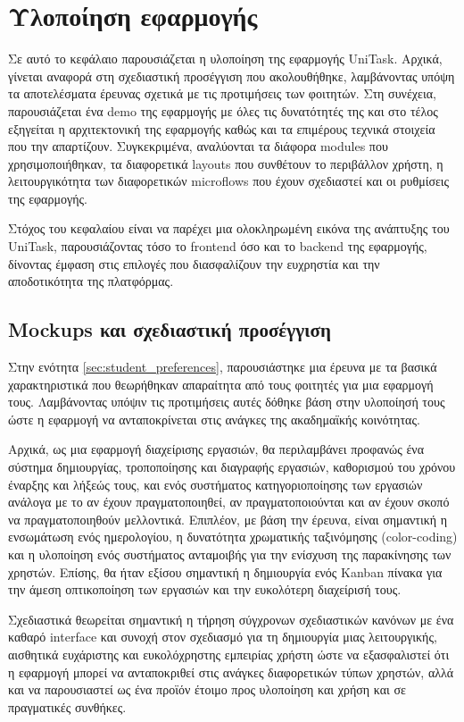 \chapter{Υλοποίηση εφαρμογής} \label{ch:unitask}
    Σε αυτό το κεφάλαιο παρουσιάζεται η υλοποίηση της εφαρμογής UniTask.  Αρχικά, γίνεται αναφορά στη σχεδιαστική προσέγγιση που ακολουθήθηκε, λαμβάνοντας υπόψη τα αποτελέσματα έρευνας σχετικά με τις προτιμήσεις των φοιτητών. Στη συνέχεια, παρουσιάζεται ένα demo της εφαρμογής με όλες τις δυνατότητές της και στο τέλος εξηγείται η αρχιτεκτονική της εφαρμογής καθώς και τα επιμέρους τεχνικά
    στοιχεία που την απαρτίζουν. Συγκεκριμένα, αναλύονται τα διάφορα modules που χρησιμοποιήθηκαν, τα διαφορετικά layouts που συνθέτουν το περιβάλλον χρήστη, η λειτουργικότητα των διαφορετικών microflows που έχουν σχεδιαστεί και οι ρυθμίσεις της εφαρμογής.

    Στόχος του κεφαλαίου είναι να παρέχει μια ολοκληρωμένη εικόνα της ανάπτυξης του UniTask, παρουσιάζοντας τόσο το frontend όσο και το backend της εφαρμογής, δίνοντας έμφαση στις επιλογές που διασφαλίζουν την ευχρηστία και την αποδοτικότητα της πλατφόρμας.

    \section{Mockups και σχεδιαστική προσέγγιση}
        Στην ενότητα \ref{sec:student_preferences}, παρουσιάστηκε μια έρευνα με τα βασικά χαρακτηριστικά που θεωρήθηκαν απαραίτητα από τους φοιτητές για μια εφαρμογή τους. Λαμβάνοντας υπόψιν τις προτιμήσεις αυτές δόθηκε βάση στην υλοποίησή τους ώστε η εφαρμογή να ανταποκρίνεται στις ανάγκες της ακαδημαϊκής κοινότητας.

        Αρχικά, ως μια εφαρμογή διαχείρισης εργασιών, θα περιλαμβάνει προφανώς ένα σύστημα δημιουργίας, τροποποίησης και διαγραφής εργασιών, καθορισμού του χρόνου έναρξης και λήξεώς τους, και ενός συστήματος κατηγοριοποίησης των εργασιών ανάλογα με το αν έχουν πραγματοποιηθεί, αν πραγματοποιούνται και αν έχουν σκοπό να πραγματοποιηθούν μελλοντικά. Επιπλέον, με βάση την έρευνα, είναι σημαντική η ενσωμάτωση ενός ημερολογίου, η δυνατότητα χρωματικής ταξινόμησης (color-coding) και η υλοποίηση ενός συστήματος ανταμοιβής για την ενίσχυση της παρακίνησης των χρηστών. Επίσης, θα ήταν εξίσου σημαντική η δημιουργία ενός Kanban πίνακα για την άμεση οπτικοποίηση των εργασιών και την ευκολότερη διαχείρισή τους.

        Σχεδιαστικά θεωρείται σημαντική η τήρηση σύγχρονων σχεδιαστικών κανόνων με ένα καθαρό interface και συνοχή στον σχεδιασμό για τη δημιουργία μιας λειτουργικής, αισθητικά ευχάριστης και ευκολόχρηστης εμπειρίας χρήστη ώστε να εξασφαλιστεί ότι η εφαρμογή μπορεί να ανταποκριθεί στις ανάγκες διαφορετικών τύπων χρηστών, αλλά και να παρουσιαστεί ως ένα προϊόν έτοιμο προς υλοποίηση και χρήση και σε πραγματικές συνθήκες.

